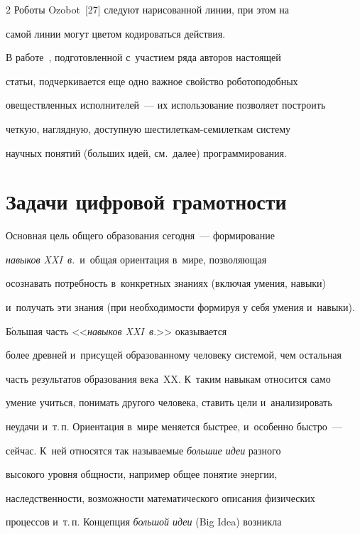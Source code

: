 \begin{multicols}{2}
 Роботы Ozobot~[27] следуют нарисованной линии, при этом на 


самой линии могут цветом кодироваться действия.


  


  В работе~\cite{24-bet}, подготовленной с~участием ряда авторов настоящей 


статьи, подчеркивается еще одно важное свойство роботоподобных 


овеществленных исполнителей~--- их использование позволяет построить 


четкую, наглядную, доступную шести\-лет\-кам-се\-ми\-лет\-кам систему 


научных понятий (больших идей, см.\ далее) программирования.





\section{Задачи цифровой грамотности}





   Основная цель общего образования сегодня~--- формирование 


\textit{навыков XXI~в.}\ и~общая ориентация в~мире, позволяющая 


осознавать потребность в~конкретных знаниях (включая умения, навыки) 


и~получать эти знания (при необходимости формируя у себя умения и~навыки). 


Б$\acute{\mbox{о}}$льшая часть <<\textit{навыков XXI~в.}>>  оказывается 


более древней и~присущей образованному человеку системой, чем остальная 


часть результатов образования века~XX. К~таким навыкам относится само 


умение учиться, понимать другого человека, ставить цели и~анализировать 


неудачи и~т.\,п. Ориентация в~мире меняется быстрее, и~особенно быст\-ро~--- 


сейчас. К~ней относятся так называемые \textit{большие идеи} разного 


высокого уровня общности, например общее понятие энергии, 


наследственности, возможности математического описания физических 


процессов и~т.\,п. Концепция \textit{большой идеи} (Big Idea) возникла 



\end{multicols}
